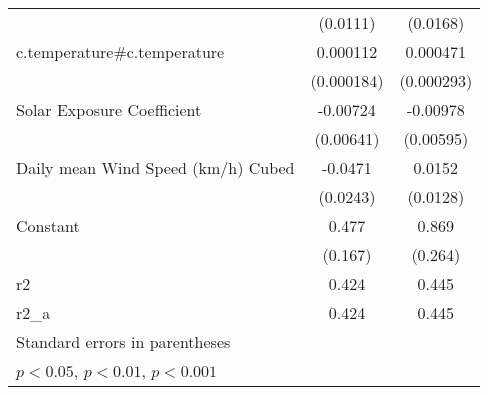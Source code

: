 {\begin{tabular}{l*{2}{c}}
                    &    (0.0111)         &    (0.0168)         \\
[1em]
c.temperature#c.temperature&    0.000112         &    0.000471         \\
                    &  (0.000184)         &  (0.000293)         \\
[1em]
Solar Exposure Coefficient&    -0.00724         &    -0.00978         \\
                    &   (0.00641)         &   (0.00595)         \\
[1em]
Daily mean Wind Speed (km/h) Cubed&     -0.0471         &      0.0152         \\
                    &    (0.0243)         &    (0.0128)         \\
[1em]
Constant            &       0.477\sym{*}  &       0.869\sym{*}  \\
                    &     (0.167)         &     (0.264)         \\
\hline
r2                  &       0.424         &       0.445         \\
r2\_a                &       0.424         &       0.445         \\
\hline\hline
\multicolumn{3}{l}{\footnotesize Standard errors in parentheses}\\
\multicolumn{3}{l}{\footnotesize \sym{*} \(p<0.05\), \sym{**} \(p<0.01\), \sym{***} \(p<0.001\)}\\
\end{tabular}
}
